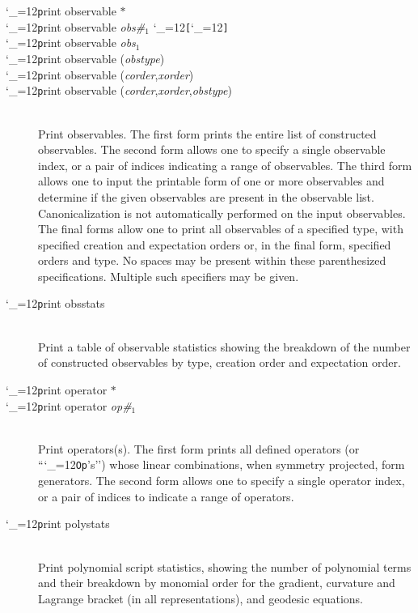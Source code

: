 \documentclass [12pt]{article}
\makeatletter
\renewcommand{\tt}{\begingroup\catcode`_=12\def\_{\string_}\tt@}
\newcommand{\tt@}[1]{\texttt{#1}\endgroup}
\makeatother
\begin{document}
\begin{description}
\item [\tt print observable $*$] \bgroup \itemsep 0pt \parskip 0pt
\item [\tt print observable {\it obs\#$_1$} \tt{[}{\it obs\#$_2$}\tt{]}]
\item [\tt print observable {\it obs$_1$} {\tt{[}{\it obs$_2$}\tt{]}} $\cdots$]
\item [\tt print observable ({\it obstype}) {\tt{[}\textit{...}\tt{]}}]
\item [\tt print observable ({\it corder},{\it xorder}) {\tt{[}\textit{...}\tt{]}}]
\item [\tt print observable ({\it corder},{\it xorder},{\it obstype}) {\tt{[}\textit{...}\tt{]}}]~\\
    Print observables.
    The first form prints the entire list of constructed observables.
    The second form allows one to 
    specify a single observable index, or a pair
    of indices indicating a range of observables.
    The third form allows one to input the printable form of one or more observables
    and determine if the given observables are present in the observable list.
    Canonicalization is not automatically performed on the input observables.
    The final forms allow one to print all observables of a specified type,
    with specified creation and expectation orders or, in the final form,
    specified orders and type.
    No spaces may be present within these parenthesized specifications.
    Multiple such specifiers may be given.
\egroup

\item [\tt print obsstats]~\\
    Print a table of observable statistics showing the breakdown of the
    number of constructed observables by type, creation order
    and expectation order.

\item [\tt print operator $*$] \bgroup \itemsep 0pt \parskip 0pt
\item [\tt print operator {\it op\#$_1$} {\tt{[}}{\it op\#$_2$}{\tt{]}}]~\\
    Print operators(s).
    The first form prints all defined operators (or ``\tt{Op}'s'')
    whose linear combinations, when symmetry projected, form generators.
    The second form allows one to 
    specify a single operator index, or a pair
    of indices to indicate a range of operators.
\egroup

\item [\tt print polystats]~\\
    Print polynomial script statistics,
    showing the number of polynomial terms and their breakdown
    by monomial order for the gradient, curvature and Lagrange bracket
    (in all representations), and geodesic equations.


\end{description}
\end{document}
